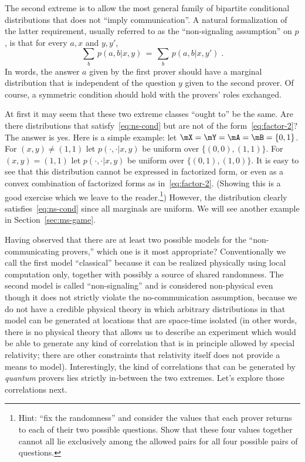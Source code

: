 The second extreme is to allow the most general family of bipartite conditional distributions that does not ``imply communication''. A natural formalization of the latter requirement, usually referred to as the ``non-signaling assumption'' on $p$, is that for every $a,x$ and $y,y'$, 
\begin{equation}\label{eq:ns-cond}
 \sum_{b}\, p(a,b|x,y)\,=\, \sum_{b}\, p(a,b|x,y')\;.
\end{equation}
In words, the answer $a$ given by the first prover should have a marginal distribution that is independent of the question $y$ given to the second prover. Of course, a symmetric condition should hold with the provers' roles exchanged. 

At first it may seem that these two extreme classes ``ought to'' be the same. Are there distributions that satisfy~\eqref{eq:ns-cond} but are not of the form~\eqref{eq:factor-2}? The answer is yes. Here is a simple example:  let $\mX = \mY = \mA=\mB = \{0,1\}$. For $(x,y)\neq (1,1)$ let $p(\cdot,\cdot | x,y)$ be uniform over $\{(0,0),(1,1)\}$. For $(x,y)= (1,1)$ let $p(\cdot,\cdot | x,y)$ be uniform over $\{(0,1),(1,0)\}$. It is easy to see that this distribution cannot be expressed in factorized form, or even as a convex combination of factorized forms as in~\eqref{eq:factor-2}. (Showing this is a good exercise which we leave to the reader.\footnote{Hint: ``fix the randomness'' and consider the  values that each prover returns to each of their two possible questions. Show that these four values together cannot all lie exclusively among the allowed pairs for all four possible pairs of questions.}) However, the distribution clearly satisfies~\eqref{eq:ns-cond} since all marginals are uniform. We will see another example in Section~\ref{sec:ms-game}.

Having observed that there are at least two possible models for the ``non-communicating provers,'' which one is it most appropriate? Conventionally we call the first model ``classical'' because it can be realized physically using local computation only, together with possibly a source of shared randomness. The second model is called ``non-signaling'' and is considered non-physical even though it does not strictly violate the no-communication assumption, because we do not have a credible physical theory in which arbitrary distributions in that model can be generated at locations that are space-time isolated (in other words, there is no physical theory that allows us to describe an experiment which would be able to generate any kind of correlation that is in principle allowed by special relativity; there are other constraints that relativity itself does not provide a means to model). Interestingly, the kind of correlations that can be generated by \emph{quantum} provers lies strictly in-between the two extremes. Let's explore those correlations next. 

